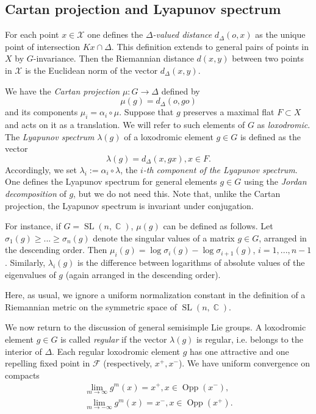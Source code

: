 \documentclass[12pt]{amsbook}%
\theoremstyle{definition}
\theoremstyle{remark}
\numberwithin{section}{chapter}
\numberwithin{subsection}{section}
\numberwithin{figure}{chapter}
\DeclareMathOperator{\C}{\mathbb{C}}
\DeclareMathOperator{\SL}{SL}
\DeclareMathOperator{\Opp}{Opp}
\def\cF{{\mathscr{F}}}
\def\cX{{\mathscr{X}}}
\def\la{\lambda}
\begin{document}
{{\subsection{Cartan projection and Lyapunov spectrum}\label{sec:Cartan and Lyapunov}

 For each point $x\in \cX$ one defines the {\em $\Delta$-valued distance} 
 $d_\Delta(o,x)$ as the unique point of intersection $Kx\cap \Delta$. 
This definition extends to general pairs of points in $X$ by $G$-invariance. Then the Riemannian distance $d(x,y)$ between 
two points in $\cX$ is the Euclidean norm of the vector $d_\Delta(x,y)$. 

We have the {\em Cartan projection} $\mu: G\to \Delta$ defined by  
$$
\mu(g)= d_\Delta(o, go) 
$$
and its components $\mu_i= \alpha_i\circ \mu$. Suppose that $g$ preserves a maximal flat $F\subset X$ and acts on it as a translation. We will refer to such elements of $G$ as {\em loxodromic}. 
The {\em Lyapunov spectrum} $\lambda(g)$ of a loxodromic element $g\in G$ is defined as the vector 
$$
\lambda(g)= d_\Delta(x, gx), x\in F.  
$$
Accordingly, we set $\lambda_i:= \alpha_i\circ \lambda$, the {\em $i$-th component of the Lyapunov spectrum}. One defines the Lyapunov spectrum for general elements $g\in G$ using the {\em Jordan decomposition} of $g$, but we do not need this. Note that, unlike the Cartan projection, the Lyapunov spectrum is invariant under conjugation. 

For instance, if $G=\SL(n,\C)$, $\mu(g)$ can be defined as follows. Let $\sigma_1(g)\geqslant ...\geqslant \sigma_n(g)$ 
denote the singular values of a matrix $g\in G$, arranged in the descending order. Then $\mu_i(g)= \log \sigma_i(g)- \log \sigma_{i+1}(g)$, $i=1,...,n-1$. Similarly, $\la_i(g)$ is the difference between logarithms of absolute values of 
the eigenvalues of $g$ (again arranged in the descending order). 




Here, as usual, we ignore a uniform normalization constant in the definition of a Riemannian metric on the symmetric space of $\SL(n,\C)$. 



We now return to the discussion of general semisimple Lie groups. A loxodromic element $g\in G$ is called {\em regular} if the vector $\lambda(g)$ is regular, 
i.e. belongs to the interior of $\Delta$. Each regular loxodromic element $g$ has one attractive and one repelling fixed point in $\cF$ (respectively, $x^+, x^-$). We have uniform convergence on compacts 
\begin{align}\label{eq:polar action} 
\lim_{m\to\infty} g^m(x) = x^+, x\in \Opp(x^-), \\ \lim_{m\to-\infty} g^m(x) = x^-, x\in \Opp(x^+). 
\end{align}

}}
\end{document}
